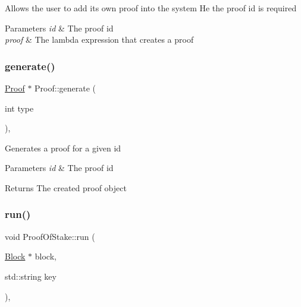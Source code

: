Allows the user to add its own proof into the system He the proof id is required


\begin{DoxyParams}{Parameters}
{\em id} & The proof id \\
\hline
{\em proof} & The lambda expression that creates a proof \\
\hline
\end{DoxyParams}
\mbox{\label{classProof_a267f0f4587babb59884b5f280e2d54c8}} 
\subsubsection{\texorpdfstring{generate()}{generate()}}
{\footnotesize\ttfamily \mbox{\hyperlink{classProof}{Proof}} $\ast$ Proof\+::generate (\begin{DoxyParamCaption}\item[{int}]{type }\end{DoxyParamCaption})\hspace{0.3cm}{\ttfamily [static]}, {\ttfamily [inherited]}}

Generates a proof for a given id


\begin{DoxyParams}{Parameters}
{\em id} & The proof id \\
\hline
\end{DoxyParams}
\begin{DoxyReturn}{Returns}
The created proof object 
\end{DoxyReturn}
\mbox{\label{classProofOfStake_aed9baba95df4aba7e8bd0a3e70c44945}} 
\subsubsection{\texorpdfstring{run()}{run()}}
{\footnotesize\ttfamily void Proof\+Of\+Stake\+::run (\begin{DoxyParamCaption}\item[{\mbox{\hyperlink{classBlock}{Block}} $\ast$}]{block,  }\item[{std\+::string}]{key }\end{DoxyParamCaption})\hspace{0.3cm}{\ttfamily [override]}, {\ttfamily [virtual]}}

